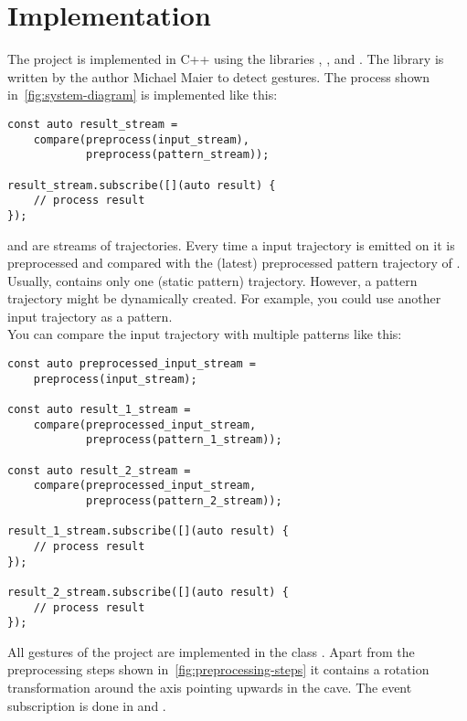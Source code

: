 \section{Implementation}

The project is implemented in C++ using the libraries \BoostGeometry, \RxCpp, \rangeLib and \trajecmp.
The library \trajecmp is written by the author Michael Maier to detect gestures.
The process shown in~\autoref{fig:system-diagram} is implemented like this:

\begin{lstlisting}
const auto result_stream =
    compare(preprocess(input_stream),
            preprocess(pattern_stream));

result_stream.subscribe([](auto result) {
    // process result
});
\end{lstlisting}

\noindent
{} and  are streams of trajectories.
Every time a input trajectory is emitted on  it is preprocessed and compared with the (latest) preprocessed pattern trajectory of .
Usually,  contains only one (static pattern) trajectory.
However, a pattern trajectory might be dynamically created.
For example, you could use another input trajectory as a pattern.\\

\noindent
You can compare the input trajectory with multiple patterns like this:

\begin{lstlisting}
const auto preprocessed_input_stream =
    preprocess(input_stream);

const auto result_1_stream =
    compare(preprocessed_input_stream,
            preprocess(pattern_1_stream));

const auto result_2_stream =
    compare(preprocessed_input_stream,
            preprocess(pattern_2_stream));

result_1_stream.subscribe([](auto result) {
    // process result
});

result_2_stream.subscribe([](auto result) {
    // process result
});
\end{lstlisting}

\noindent
All gestures of the project are implemented in the class .
Apart from the preprocessing steps shown in~\autoref{fig:preprocessing-steps} it contains a rotation transformation around the axis pointing upwards in the cave.
The event subscription is done in  and .